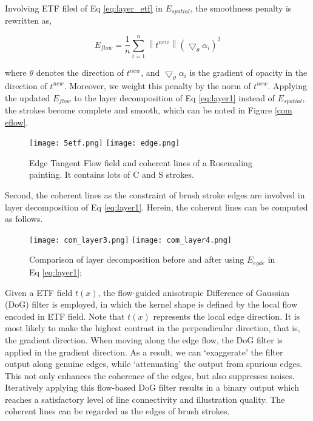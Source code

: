 Involving ETF filed of Eq \ref{eq:layer_etf} in $E_{spatial}$, the smoothness penalty is rewritten as,

\begin{equation} 
E_{flow}=\frac{1}{n} \sum_{i=1}^{n} \left \| t^{new} \right \| \left ( \bigtriangledown_{\theta}\alpha_{i} \right )^2 
\end{equation} 

where $\theta$ denotes the direction of $t^{new}$, and $ \bigtriangledown_{\theta}\alpha_{i} $ is the gradient of opacity in the direction of $t^{new}$. Moreover, we weight this penalty by the norm of $t^{new}$. Applying the updated $E_{flow}$ to the layer decomposition of Eq \ref{eq:layer1} instead of $E_{spatial}$, the strokes become complete and smooth, which can be noted in Figure \ref{com eflow}.

\begin{figure}[H]
	\centering
	\texttt{[image: 5etf.png]}
	\texttt{[image: edge.png]}
	\caption{Edge Tangent Flow field and coherent lines of a Rosemaling painting. It contains lots of C and S strokes.}
\end{figure}


Second, the coherent lines as the constraint of brush stroke edges are involved in layer decomposition of Eq \ref{eq:layer1}. Herein, the coherent lines can be computed as follows.
\begin{figure}[H]
	\centering
	\texttt{[image: com\_layer3.png]}
	\texttt{[image: com\_layer4.png]}
	\caption{Comparison of layer decomposition before and after using $E_{egde}$  in Eq \ref{eq:layer1}; }
	\label{com:edge}
\end{figure}
Given a ETF field $t(x)$, the flow-guided anisotropic Difference of Gaussian (DoG) filter is employed, in which the kernel shape is defined by the local flow encoded in ETF field. Note that $t(x)$ represents the local edge direction. It is most likely to make the highest contrast in the perpendicular direction, that is, the gradient direction. When moving along the edge flow, the DoG filter is applied in the gradient direction. As a result, we can ‘exaggerate’ the filter output along genuine edges, while ‘attenuating’ the output from spurious edges. This not only enhances the coherence of the edges, but also suppresses noises. Iteratively applying this flow-based DoG filter results in a binary output which reaches a satisfactory level of line connectivity and illustration quality. The coherent lines can be regarded as the edges of brush strokes.


